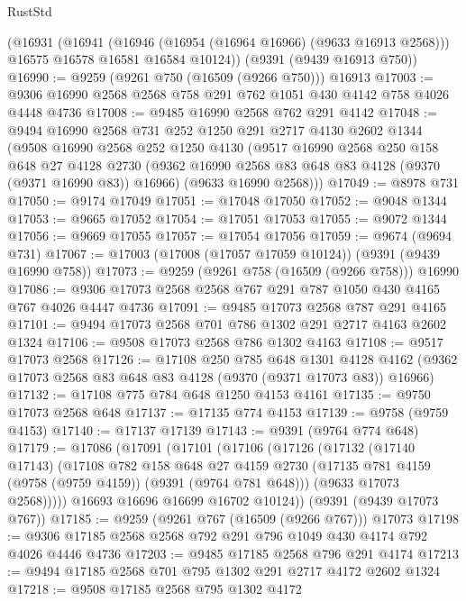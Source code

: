 \begin{lexlean}{RustStd}
\begin{coremodule}
    (@16931
      (@16941
        (@16946 (@16954 (@16964 @16966) (@9633 @16913 @2568)))
        @16575
        @16578
        @16581
        @16584
        @10124))
    (@9391 (@9439 @16913 @750))
@16990 := @9259 (@9261 @750 (@16509 (@9266 @750))) @16913
@17003 := @9306 @16990 @2568 @2568 @758 @291 @762 @1051 @430 @4142 @758 @4026 @4448 @4736
@17008 := @9485 @16990 @2568 @762 @291 @4142
@17048 := @9494
    @16990
    @2568
    @731
    @252
    @1250
    @291
    @2717
    @4130
    @2602
    @1344
    (@9508
      @16990
      @2568
      @252
      @1250
      @4130
      (@9517
        @16990
        @2568
        @250
        @158
        @648
        @27
        @4128
        @2730
        (@9362 @16990 @2568 @83 @648 @83 @4128 (@9370 (@9371 @16990 @83)) @16966)
        (@9633 @16990 @2568)))
@17049 := @8978 @731
@17050 := @9174 @17049
@17051 := @17048 @17050
@17052 := @9048 @1344
@17053 := @9665 @17052
@17054 := @17051 @17053
@17055 := @9072 @1344
@17056 := @9669 @17055
@17057 := @17054 @17056
@17059 := @9674 (@9694 @731)
@17067 := @17003 (@17008 (@17057 @17059 @10124)) (@9391 (@9439 @16990 @758))
@17073 := @9259 (@9261 @758 (@16509 (@9266 @758))) @16990
@17086 := @9306 @17073 @2568 @2568 @767 @291 @787 @1050 @430 @4165 @767 @4026 @4447 @4736
@17091 := @9485 @17073 @2568 @787 @291 @4165
@17101 := @9494 @17073 @2568 @701 @786 @1302 @291 @2717 @4163 @2602 @1324
@17106 := @9508 @17073 @2568 @786 @1302 @4163
@17108 := @9517 @17073 @2568
@17126 := @17108
    @250
    @785
    @648
    @1301
    @4128
    @4162
    (@9362 @17073 @2568 @83 @648 @83 @4128 (@9370 (@9371 @17073 @83)) @16966)
@17132 := @17108 @775 @784 @648 @1250 @4153 @4161
@17135 := @9750 @17073 @2568 @648
@17137 := @17135 @774 @4153
@17139 := @9758 (@9759 @4153)
@17140 := @17137 @17139
@17143 := @9391 (@9764 @774 @648)
@17179 := @17086
    (@17091
      (@17101
        (@17106
          (@17126
            (@17132
              (@17140 @17143)
              (@17108
                @782
                @158
                @648
                @27
                @4159
                @2730
                (@17135 @781 @4159 (@9758 (@9759 @4159)) (@9391 (@9764 @781 @648)))
                (@9633 @17073 @2568)))))
        @16693
        @16696
        @16699
        @16702
        @10124))
    (@9391 (@9439 @17073 @767))
@17185 := @9259 (@9261 @767 (@16509 (@9266 @767))) @17073
@17198 := @9306 @17185 @2568 @2568 @792 @291 @796 @1049 @430 @4174 @792 @4026 @4446 @4736
@17203 := @9485 @17185 @2568 @796 @291 @4174
@17213 := @9494 @17185 @2568 @701 @795 @1302 @291 @2717 @4172 @2602 @1324
@17218 := @9508 @17185 @2568 @795 @1302 @4172

\end{coremodule}
\end{lexlean}
